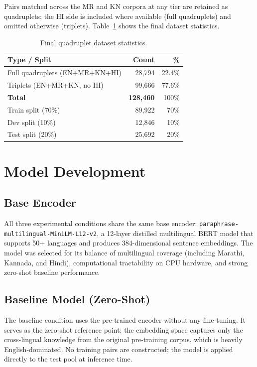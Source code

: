 \documentclass[conference,letterpaper]{IEEEtran}
\begin{document}
Pairs matched across the MR and KN corpora at any tier are retained as
quadruplets; the HI side is included where available (full quadruplets)
and omitted otherwise (triplets). Table~\ref{tab:quadstats} shows the
final dataset statistics.

\begin{table}[h]
\centering
\caption{Final quadruplet dataset statistics.}
\label{tab:quadstats}
\renewcommand{\arraystretch}{1.2}
\begin{tabular}{lrr}
\toprule
\textbf{Type / Split} & \textbf{Count} & \textbf{\%} \\
\midrule
Full quadruplets (EN+MR+KN+HI) & 28,794  & 22.4\% \\
Triplets (EN+MR+KN, no HI)     & 99,666  & 77.6\% \\
\midrule
\textbf{Total}   & \textbf{128,460} & 100\% \\
\midrule
Train split (70\%) & 89,922  & 70\% \\
Dev split (10\%)   & 12,846  & 10\% \\
Test split (20\%)  & 25,692  & 20\% \\
\bottomrule
\end{tabular}
\end{table}

\vspace{0.5cm}

\section{Model Development}

\subsection{Base Encoder}
All three experimental conditions share the same base encoder:
\texttt{paraphrase-multilingual-MiniLM-L12-v2}, a 12-layer distilled
multilingual BERT model that supports 50+ languages and produces
384-dimensional sentence embeddings. The model was selected for its
balance of multilingual coverage (including Marathi, Kannada, and Hindi),
computational tractability on CPU hardware, and strong zero-shot baseline
performance.

\subsection{Baseline Model (Zero-Shot)}
The baseline condition uses the pre-trained encoder without any
fine-tuning. It serves as the zero-shot reference point: the embedding
space captures only the cross-lingual knowledge from the original
pre-training corpus, which is heavily English-dominated. No training
pairs are constructed; the model is applied directly to the test pool
at inference time.
\end{document}
